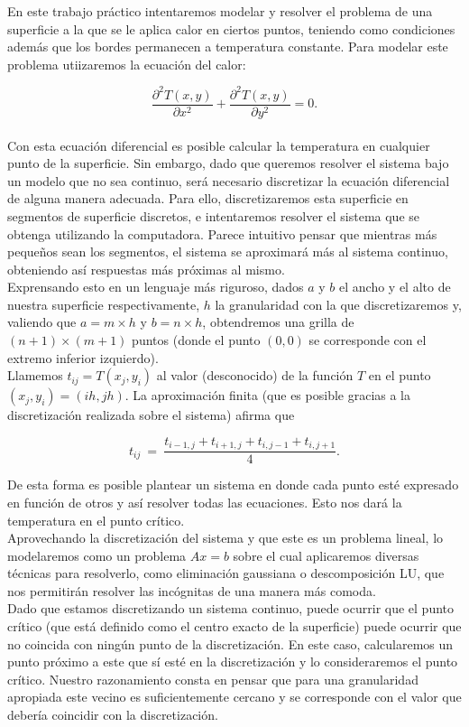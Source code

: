 En este trabajo práctico intentaremos modelar y resolver el problema de una superficie a la que se le aplica calor en ciertos puntos, teniendo como condiciones además que los bordes permanecen a temperatura constante. Para modelar este problema utiizaremos la ecuación del calor:

\begin{equation}
\frac{\partial^2T(x,y)}{\partial x^{2}}+\frac{\partial^2 T(x,y)}{\partial y^{2}} = 0.
\end{equation}\\

Con esta ecuación diferencial es posible calcular la temperatura en cualquier punto de la superficie. Sin embargo, dado que queremos resolver el sistema bajo un modelo que no sea continuo, será necesario discretizar la ecuación diferencial de alguna manera adecuada. Para ello, discretizaremos esta superficie en segmentos de superficie discretos, e intentaremos resolver el sistema que se obtenga utilizando la computadora. Parece intuitivo pensar que mientras más pequeños sean los segmentos, el sistema se aproximará más al sistema continuo, obteniendo así respuestas más próximas al mismo.
\\
Exprensando esto en un lenguaje más riguroso, dados $a$ y $b$ el ancho y el alto de nuestra superficie respectivamente, $h$ la granularidad con la que discretizaremos y, valiendo que  $a = m\times h$ y $b = n \times h$, obtendremos una grilla de $(n+1)\times(m+1)$ puntos (donde el punto $(0,0)$ se corresponde con el extremo inferior izquierdo).
\\
Llamemos $t_{ij} = T(x_j,y_i)$ al valor (desconocido) de la función $T$ en el punto $(x_j, y_i) = (ih, jh)$. La aproximación finita (que es posible gracias a la discretización realizada sobre el sistema) afirma que

\begin{equation}
t_{ij} \ =\ \frac{ t_{i-1,j} + t_{i+1,j} + t_{i,j-1} + t_{i,j+1}}{4}.
\end{equation}

De esta forma es posible plantear un sistema en donde cada punto esté expresado en función de otros y así resolver todas las ecuaciones. Esto nos dará la temperatura en el punto crítico.
\\
Aprovechando la discretización del sistema y que este es un problema lineal, lo modelaremos como un problema $Ax=b$ sobre el cual aplicaremos diversas técnicas para resolverlo, como eliminación gaussiana o descomposición LU, que nos permitirán resolver las incógnitas de una manera más comoda.
\\
Dado que estamos discretizando un sistema continuo, puede ocurrir que el punto crítico (que está definido como el centro exacto de la superficie) puede ocurrir que no coincida con ningún punto de la discretización. En este caso, calcularemos un punto próximo a este que sí esté en la discretización y lo consideraremos el punto crítico. Nuestro razonamiento consta en pensar que para una granularidad apropiada este vecino es suficientemente cercano y se corresponde con el valor que debería coincidir con la discretización.

